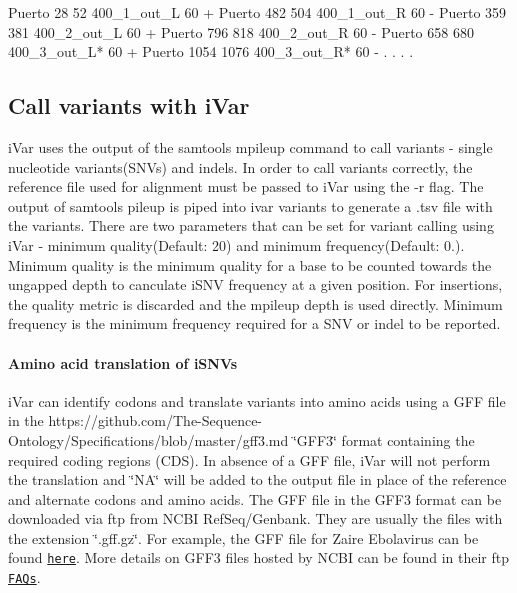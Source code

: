 \begin{DoxyCode}
Puerto  28  52  400\_1\_out\_L 60  +
Puerto  482 504 400\_1\_out\_R 60  -
Puerto  359 381 400\_2\_out\_L 60  +
Puerto  796 818 400\_2\_out\_R 60  -
Puerto  658 680 400\_3\_out\_L*    60  +
Puerto  1054    1076    400\_3\_out\_R*    60  -
.
.
.
.
\end{DoxyCode}
\hypertarget{manualpage_autotoc_md17}{}\subsection{Call variants with i\+Var}\label{manualpage_autotoc_md17}
i\+Var uses the output of the {\ttfamily samtools mpileup} command to call variants -\/ single nucleotide variants(\+S\+N\+Vs) and indels. In order to call variants correctly, the reference file used for alignment must be passed to i\+Var using the {\ttfamily -\/r} flag. The output of {\ttfamily samtools pileup} is piped into {\ttfamily ivar variants} to generate a .tsv file with the variants. There are two parameters that can be set for variant calling using i\+Var -\/ minimum quality(\+Default\+: 20) and minimum frequency(Default\+: 0.). Minimum quality is the minimum quality for a base to be counted towards the ungapped depth to canculate i\+S\+NV frequency at a given position. For insertions, the quality metric is discarded and the mpileup depth is used directly. Minimum frequency is the minimum frequency required for a S\+NV or indel to be reported. \paragraph*{Amino acid translation of i\+S\+N\+Vs}

i\+Var can identify codons and translate variants into amino acids using a G\+FF file in the https\+://github.com/\+The-\/\+Sequence-\/\+Ontology/\+Specifications/blob/master/gff3.\+md \char`\"{}\+G\+F\+F3\char`\"{} format containing the required coding regions (C\+DS). In absence of a G\+FF file, i\+Var will not perform the translation and \char`\"{}\+N\+A\char`\"{} will be added to the output file in place of the reference and alternate codons and amino acids. The G\+FF file in the G\+F\+F3 format can be downloaded via ftp from N\+C\+BI Ref\+Seq/\+Genbank. They are usually the files with the extension \char`\"{}.\+gff.\+gz\char`\"{}. For example, the G\+FF file for Zaire Ebolavirus can be found \href{ftp://ftp.ncbi.nlm.nih.gov/genomes/refseq/viral/Zaire_ebolavirus/all_assembly_versions/GCF_000848505.1_ViralProj14703}{\tt here}. More details on G\+F\+F3 files hosted by N\+C\+BI can be found in their ftp \href{https://www.ncbi.nlm.nih.gov/genome/doc/ftpfaq/}{\tt F\+A\+Qs}.

